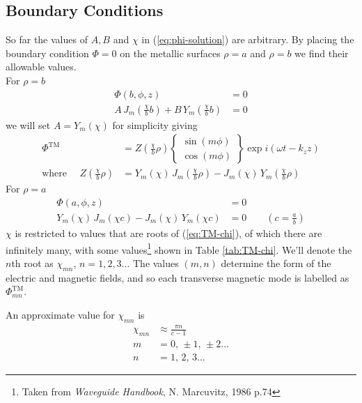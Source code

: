 \documentclass[twoside, a4paper]{article}
\begin{document}
\subsection{Boundary Conditions}
So far the values of $A,B$ and $\chi$ in (\ref{eq:phi-solution}) are arbitrary. By placing the boundary condition $\Phi = 0$ on the metallic surfaces $\rho = a$ and $\rho = b$ we find their allowable values. \\
For $\rho = b$
\begin{align}
	\Phi ( b, \phi, z) & = 0 
	\nonumber \\
	A \, J_m \left( \frac{ \chi }{b} b \right) + B \, Y_m \left( \frac{ \chi }{b} b \right) & = 0
	\nonumber
\end{align}
we will set $A = Y_m \left( \chi \right)$ for simplicity giving
\begin{align}
	\label{eq:TM-Phi}
	\Phi^{\text{TM}} & = 
	Z \left( \frac{\chi}{b} \rho \right)
	\left\{
	\begin{array}{c}
		\sin \left( m \phi \right) 
		\\
		\cos \left( m \phi \right)
	\end{array}
	\right\}
	\exp i \left( \omega t - k_z z \right) \\
	\label{eq:TM-Z}
	\text{where } \quad
	Z\left( \frac{\chi}{b} \rho\right) & = Y_m \left( \chi \right) \, J_m \left( \frac{ \chi}{b} \rho \right) - J_m \left( \chi \right) \, Y_m \left( \frac{ \chi }{b} \rho \right)
\end{align}
For $\rho = a$
\begin{align}
	\label{eq:TM-chi}
	\Phi ( a, \phi, z) & = 0 
	\nonumber \\
	Y_m \left( \chi \right) \, J_m \left( \chi c \right) - J_m \left( \chi \right) \, Y_m \left( \chi c  \right) & = 0
	\quad \quad
	\left(
	c = \frac{a}{b}
	\right)
\end{align}
$\chi$ is restricted to values that are roots of (\ref{eq:TM-chi}), of which there are infinitely many, with some values\footnote{Taken from \textit{Waveguide Handbook}, N. Marcuvitz, 1986 p.74} shown in Table \ref{tab:TM-chi}. We'll denote the $n$th root as $\chi_{mn}$, $n = 1, 2, 3 \ldots$ The values $(m, n)$ determine the form of the electric and magnetic fields, and so each transverse magnetic mode is labelled as $\Phi^{\text{TM}}_{mn}$.

 An approximate value for $\chi_{mn}$ is 
\begin{align}
	\label{eq:TM-chi-approx}
	\chi_{mn} & \approx \frac{\pi n}{c-1} \\
	m & = 0, \, \pm 1, \, \pm 2 \ldots \nonumber \\
	n & = 1, \, 2, \, 3 \ldots \nonumber 
\end{align}
\end{document}
